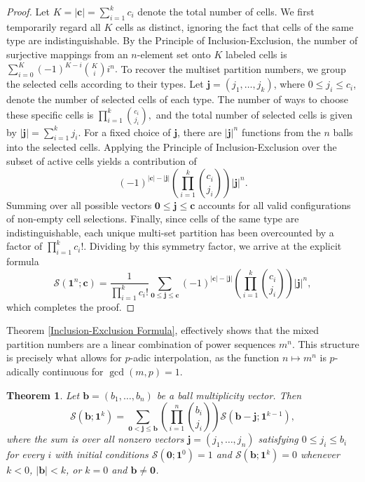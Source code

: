 \documentclass[12pt]{amsart}
\newtheorem{theorem}{Theorem}[section]
\theoremstyle{definition}
\begin{document}
\begin{proof}
Let $K = |\mathbf{c}| = \sum_{i=1}^{k} c_i$ denote the total number of cells. 
We first temporarily regard all $K$ cells as distinct, ignoring the fact that cells of the same type are indistinguishable. By the Principle of Inclusion-Exclusion, the number of surjective mappings from an $n$-element set onto $K$ labeled cells is $\sum_{i=0}^{K} (-1)^{K-i} \binom{K}{i} i^n.$ To recover the multiset partition numbers, we group the selected cells according to their types. Let $\mathbf{j} = (j_1, \ldots, j_k)$, where $0 \le j_i \le c_i$, denote the number of selected cells of each type. The number of ways to choose these specific cells is $\prod_{i=1}^{k} \binom{c_i}{j_i}, $ and the total number of selected cells is given by $|\mathbf{j}| = \sum_{i=1}^{k} j_i$. 
For a fixed choice of $\mathbf{j}$, there are $|\mathbf{j}|^n$ functions from the $n$ balls into the selected cells. Applying the Principle of Inclusion-Exclusion over the subset of active cells yields a contribution of
\begin{equation*}
    (-1)^{|\mathbf{c}| - |\mathbf{j}|} \left( \prod_{i=1}^{k} \binom{c_i}{j_i} \right) |\mathbf{j}|^n.
\end{equation*}
Summing over all possible vectors $\mathbf{0} \le \mathbf{j} \le \mathbf{c}$ accounts for all valid configurations of non-empty cell selections. Finally, since cells of the same type are indistinguishable, each unique multi-set partition has been overcounted by a factor of $\prod_{i=1}^{k} c_i!.$ Dividing by this symmetry factor, we arrive at the explicit formula
\begin{equation*}
    \mathcal{S}(\mathbf{1}^n; \mathbf{c}) = \frac{1}{\prod_{i=1}^{k} c_i!} \sum_{\mathbf{0} \le \mathbf{j} \le \mathbf{c}} (-1)^{|\mathbf{c}| - |\mathbf{j}|} \left( \prod_{i=1}^{k} \binom{c_i}{j_i} \right) |\mathbf{j}|^n,
\end{equation*}
which completes the proof.
\end{proof}
Theorem \ref{Inclusion-Exclusion Formula}, effectively shows that the mixed partition numbers are a linear combination of power sequences $m^n$. This structure is precisely what allows for $p$-adic interpolation, as the function $n \mapsto m^n$ is $p$-adically continuous for $\gcd(m, p) = 1$.
\begin{theorem}\label{ballrec}
Let $\mathbf{b} = (b_1, \ldots, b_n)$ be a ball multiplicity vector. Then
\[
\mathcal{S}(\mathbf{b}; \mathbf{1}^k)
=
\sum_{\mathbf{0} < \mathbf{j} \le \mathbf{b}}
\left(
\prod_{i=1}^{n}
\binom{b_i}{j_i}
\right)
\mathcal{S}(\mathbf{b} - \mathbf{j}; \mathbf{1}^{k-1}),
\]
where the sum is over all nonzero vectors $\mathbf{j} = (j_1, \ldots, j_n)$ satisfying $0 \le j_i \le b_i$ for every $i$ with initial conditions $\mathcal{S}(\mathbf{0}; \mathbf{1}^0) = 1$ and $\mathcal{S}(\mathbf{b}; \mathbf{1}^k) = 0$ whenever $k < 0$, $|\mathbf{b}| < k$, or $k = 0$ and $\mathbf{b} \neq \mathbf{0}$.
\end{theorem}
\end{document}
